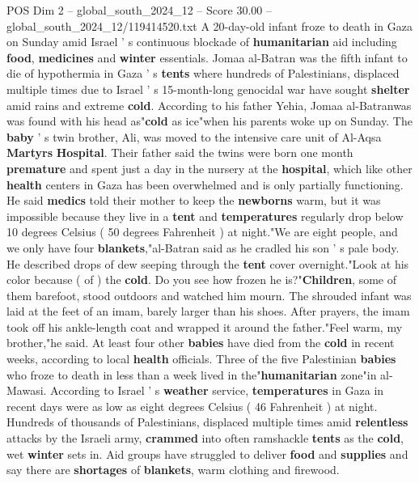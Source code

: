 \begin{textsample}{POS Dim 2 – global\_south\_2024\_12 – Score 30.00 – global\_south\_2024\_12/119414520.txt}  \label{ex:f2_pos_063}
A 20-day-old infant froze to death in Gaza on Sunday amid Israel ' s continuous blockade of \textbf{humanitarian} aid including \textbf{food}, \textbf{medicines} and \textbf{winter} essentials.
Jomaa al-Batran was the fifth infant to die of hypothermia in Gaza ' s \textbf{tents} where hundreds of Palestinians, displaced multiple times due to Israel ' s 15-month-long genocidal war have sought \textbf{shelter} amid rains and extreme \textbf{cold}.
According to his father Yehia, Jomaa al-Batranwas was found with his head as"\textbf{cold} as ice"when his parents woke up on Sunday.
The \textbf{baby} ' s twin brother, Ali, was moved to the intensive care unit of Al-Aqsa \textbf{Martyrs} \textbf{Hospital}.
Their father said the twins were born one month \textbf{premature} and spent just a day in the nursery at the \textbf{hospital}, which like other \textbf{health} centers in Gaza has been overwhelmed and is only partially functioning.
He said \textbf{medics} told their mother to keep the \textbf{newborns} warm, but it was impossible because they live in a \textbf{tent} and \textbf{temperatures} regularly drop below 10 degrees Celsius ( 50 degrees Fahrenheit ) at night."We are eight people, and we only have four \textbf{blankets},"al-Batran said as he cradled his son ' s pale body.
He described drops of dew seeping through the \textbf{tent} cover overnight."Look at his color because ( of ) the \textbf{cold}.
Do you see how frozen he is?"\textbf{Children}, some of them barefoot, stood outdoors and watched him mourn.
The shrouded infant was laid at the feet of an imam, barely larger than his shoes.
After prayers, the imam took off his ankle-length coat and wrapped it around the father."Feel warm, my brother,"he said.
At least four other \textbf{babies} have died from the \textbf{cold} in recent weeks, according to local \textbf{health} officials.
Three of the five Palestinian \textbf{babies} who froze to death in less than a week lived in the"\textbf{humanitarian} zone"in al-Mawasi.
According to Israel ' s \textbf{weather} service, \textbf{temperatures} in Gaza in recent days were as low as eight degrees Celsius ( 46 Fahrenheit ) at night.
Hundreds of thousands of Palestinians, displaced multiple times amid \textbf{relentless} attacks by the Israeli army, \textbf{crammed} into often ramshackle \textbf{tents} as the \textbf{cold}, wet \textbf{winter} sets in.
Aid groups have struggled to deliver \textbf{food} and \textbf{supplies} and say there are \textbf{shortages} of \textbf{blankets}, warm clothing and firewood.

\end{textsample}
